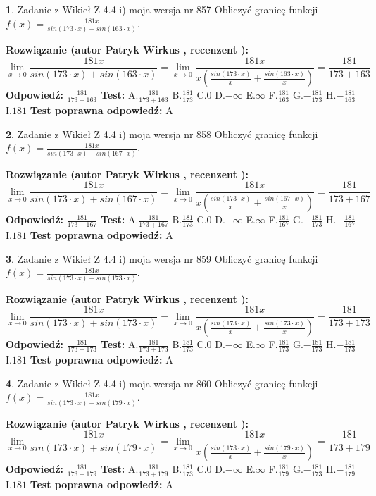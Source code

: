 \documentclass[12pt, a4paper]{article}
\theoremstyle{definition} %
\newtheorem{zad}{}
\newcommand{\zadStart}[1]{\begin{zad}#1\newline}
\newcommand{\zadStop}{\end{zad}}
\newcommand{\rozwStart}[2]{\noindent \textbf{Rozwiązanie (autor #1 , recenzent #2): }\newline}
\newcommand{\rozwStop}{\newline}
\newcommand{\odpStart}{\noindent \textbf{Odpowiedź:}\newline}
\newcommand{\odpStop}{\newline}
\newcommand{\testStart}{\noindent \textbf{Test:}\newline}
\newcommand{\testStop}{\newline}
\newcommand{\kluczStart}{\noindent \textbf{Test poprawna odpowiedź:}\newline}
\newcommand{\kluczStop}{\newline}
\begin{document}
\zadStart{Zadanie z Wikieł Z 4.4 i) moja wersja nr 857}
Obliczyć granicę funkcji $f(x)=\frac{181x}{sin(173\cdot x) +sin(163\cdot x)}$.
\zadStop
\rozwStart{Patryk Wirkus}{}
$$\lim\limits_{x\to 0}\frac{181x}{sin(173\cdot x) +sin(163\cdot x)}=\lim\limits_{x\to 0}\frac{181x}{x(\frac{sin(173\cdot x)}{x}+\frac{sin(163\cdot x)}{x})}=\frac{181}{173+163}$$
\rozwStop
\odpStart
$\frac{181}{173+163}$
\odpStop
\testStart
A.$\frac{181}{173+163}$
B.$\frac{181}{173}$
C.$0$
D.$-\infty$
E.$\infty$
F.$\frac{181}{163}$
G.$-\frac{181}{173}$
H.$-\frac{181}{163}$
I.$181$
\testStop
\kluczStart
A
\kluczStop



\zadStart{Zadanie z Wikieł Z 4.4 i) moja wersja nr 858}
Obliczyć granicę funkcji $f(x)=\frac{181x}{sin(173\cdot x) +sin(167\cdot x)}$.
\zadStop
\rozwStart{Patryk Wirkus}{}
$$\lim\limits_{x\to 0}\frac{181x}{sin(173\cdot x) +sin(167\cdot x)}=\lim\limits_{x\to 0}\frac{181x}{x(\frac{sin(173\cdot x)}{x}+\frac{sin(167\cdot x)}{x})}=\frac{181}{173+167}$$
\rozwStop
\odpStart
$\frac{181}{173+167}$
\odpStop
\testStart
A.$\frac{181}{173+167}$
B.$\frac{181}{173}$
C.$0$
D.$-\infty$
E.$\infty$
F.$\frac{181}{167}$
G.$-\frac{181}{173}$
H.$-\frac{181}{167}$
I.$181$
\testStop
\kluczStart
A
\kluczStop



\zadStart{Zadanie z Wikieł Z 4.4 i) moja wersja nr 859}
Obliczyć granicę funkcji $f(x)=\frac{181x}{sin(173\cdot x) +sin(173\cdot x)}$.
\zadStop
\rozwStart{Patryk Wirkus}{}
$$\lim\limits_{x\to 0}\frac{181x}{sin(173\cdot x) +sin(173\cdot x)}=\lim\limits_{x\to 0}\frac{181x}{x(\frac{sin(173\cdot x)}{x}+\frac{sin(173\cdot x)}{x})}=\frac{181}{173+173}$$
\rozwStop
\odpStart
$\frac{181}{173+173}$
\odpStop
\testStart
A.$\frac{181}{173+173}$
B.$\frac{181}{173}$
C.$0$
D.$-\infty$
E.$\infty$
F.$\frac{181}{173}$
G.$-\frac{181}{173}$
H.$-\frac{181}{173}$
I.$181$
\testStop
\kluczStart
A
\kluczStop



\zadStart{Zadanie z Wikieł Z 4.4 i) moja wersja nr 860}
Obliczyć granicę funkcji $f(x)=\frac{181x}{sin(173\cdot x) +sin(179\cdot x)}$.
\zadStop
\rozwStart{Patryk Wirkus}{}
$$\lim\limits_{x\to 0}\frac{181x}{sin(173\cdot x) +sin(179\cdot x)}=\lim\limits_{x\to 0}\frac{181x}{x(\frac{sin(173\cdot x)}{x}+\frac{sin(179\cdot x)}{x})}=\frac{181}{173+179}$$
\rozwStop
\odpStart
$\frac{181}{173+179}$
\odpStop
\testStart
A.$\frac{181}{173+179}$
B.$\frac{181}{173}$
C.$0$
D.$-\infty$
E.$\infty$
F.$\frac{181}{179}$
G.$-\frac{181}{173}$
H.$-\frac{181}{179}$
I.$181$
\testStop
\kluczStart
A
\kluczStop
\end{document}
